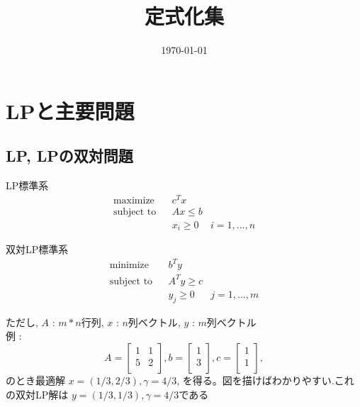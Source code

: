 \documentclass[13pt, a4paper, landscape]{jarticle}
\title{定式化集}
\date {\today}
\theoremstyle{nonitalic} %
\begin{document}
\maketitle

\section{LPと主要問題}
\subsection {LP, LPの双対問題}

LP標準系
\begin{align}
 &&&&&\textrm{maximize}   && c^Tx \\
 &&&&&\textrm{subject to} && Ax \leq b  &&&&&\\
 &&&&&                    && x_i \geq 0 & i = 1,...,n &&&&&
\end{align}

双対LP標準系
\begin{align}
 &&&&&\textrm{minimize}   && b^Ty \\
 &&&&&\textrm{subject to} && A^T y \geq c  &&&&&\\
 &&&&&                    && y_j \geq 0 & j = 1,...,m &&&&&
\end{align}

ただし, 
$A$ : $m*n$行列, 
$x$ : $n$列ベクトル, 
$y$ : $m$列ベクトル \\

例 : 
\begin{equation*}
 A = 
 \left[\begin{array}{cc}
  1 & 1 \\
  5 & 2 \\
 \end{array}\right],
 b = 
 \left[\begin{array}{c}
     1 \\
     3 \\
   \end{array}\right],
 c = 
 \left[\begin{array}{c}
     1 \\
     1 \\
 \end{array}\right], 
 
\end{equation*}
のとき最適解 $x = (1/3, 2/3) , \gamma = 4/3  $, を得る。図を描けばわかりやすい.これの双対LP解は
$y = (1/3, 1/3), \gamma = 4/3$である
\end{document}
